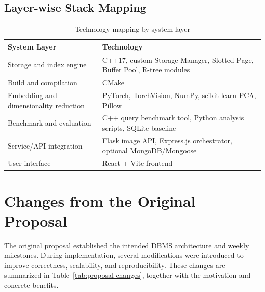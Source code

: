 \documentclass[11pt,a4paper]{article}
\begin{document}
\subsection{Layer-wise Stack Mapping}

\begin{table}[H]
\centering
\caption{Technology mapping by system layer}
\begin{tabular}{p{}p{}}
\toprule
System Layer & Technology \\
\midrule
Storage and index engine & C++17, custom Storage Manager, Slotted Page, Buffer Pool, R-tree modules \\
Build and compilation & CMake \\
Embedding and dimensionality reduction & PyTorch, TorchVision, NumPy, scikit-learn PCA, Pillow \\
Benchmark and evaluation & C++ query benchmark tool, Python analysis scripts, SQLite baseline \\
Service/API integration & Flask image API, Express.js orchestrator, optional MongoDB/Mongoose \\
User interface & React + Vite frontend \\
\bottomrule
\end{tabular}
\end{table}

\section{Changes from the Original Proposal}

The original proposal established the intended DBMS architecture and weekly milestones. During implementation, several modifications were introduced to improve correctness, scalability, and reproducibility. These changes are summarized in Table~\ref{tab:proposal-changes}, together with the motivation and concrete benefits.
\end{document}

